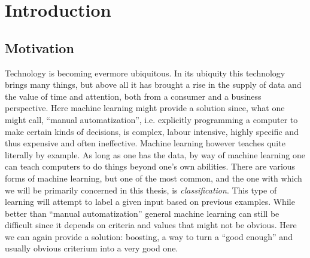 
\chapter{Introduction}
\label{chap:intro}
\section{Motivation}
\label{sec:motiv}

Technology is becoming evermore ubiquitous. In its ubiquity this technology brings many things, but above all it has brought a rise in the supply of data and the value of time and attention, both from a consumer and a business perspective. Here machine learning might provide a solution since, what one might call, ``manual automatization'', i.e. explicitly programming a computer to make certain kinds of decisions, is complex, labour intensive, highly specific and thus expensive and often ineffective. Machine learning however teaches quite literally by example. As long as one has the data, by way of machine learning one can teach computers to do things beyond one's own abilities. There are various forms of machine learning, but one of the most common, and the one with which we will be primarily concerned in this thesis, is \textit{classification}. This type of learning will attempt to label a given input based on previous examples. While better than ``manual automatization'' general machine learning can still be difficult since it depends on criteria and values that might not be obvious. Here we can again provide a solution: boosting, a way to turn a ``good enough'' and usually obvious criterium into a very good one.

